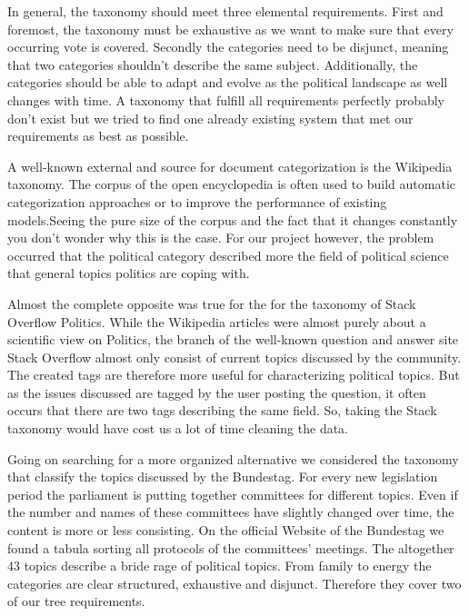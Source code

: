 In general, the taxonomy should meet three elemental requirements. First and foremost, the taxonomy must be exhaustive as we want to make sure that every occurring vote is covered. Secondly the categories need to be disjunct, meaning that two categories shouldn't describe the same subject. Additionally, the categories should be able to adapt and evolve as the political landscape as well changes with time. A taxonomy that fulfill all requirements perfectly probably don't exist but we tried to find one already existing system that met our requirements as best as possible.
% 
% 
% 
% 

A well-known external and source for document categorization is the Wikipedia taxonomy. The corpus of the open encyclopedia is often used to build automatic categorization approaches or to improve the performance of existing models.Seeing the pure size of the corpus and the fact that it changes constantly you don’t wonder why this is the case.  For our project however, the problem occurred that the political category described more the field of political science that general topics politics are coping with. 

Almost the complete opposite was true for the for the taxonomy of Stack Overflow Politics. While the Wikipedia articles were almost purely about a scientific view on Politics, the branch of the well-known question and answer site Stack Overflow almost only consist of current topics discussed by the community. The created tags are therefore more useful for characterizing political topics. But as the issues discussed are tagged by the user posting the question, it often occurs that there are two tags describing the same field. So, taking the Stack taxonomy would have cost us a lot of time cleaning the data. 

Going on searching for a more organized alternative we considered the taxonomy that classify the topics discussed by the Bundestag. For every new legislation period the parliament is putting together committees for different topics. Even if the number and names of these committees have slightly changed over time, the content is more or less consisting. On the official Website of the Bundestag we found a tabula sorting all protocols of the committees' meetings. The altogether 43 topics describe a bride rage of political topics. From family to energy the categories are clear structured, exhaustive and disjunct. Therefore they cover two of our tree requirements. 

